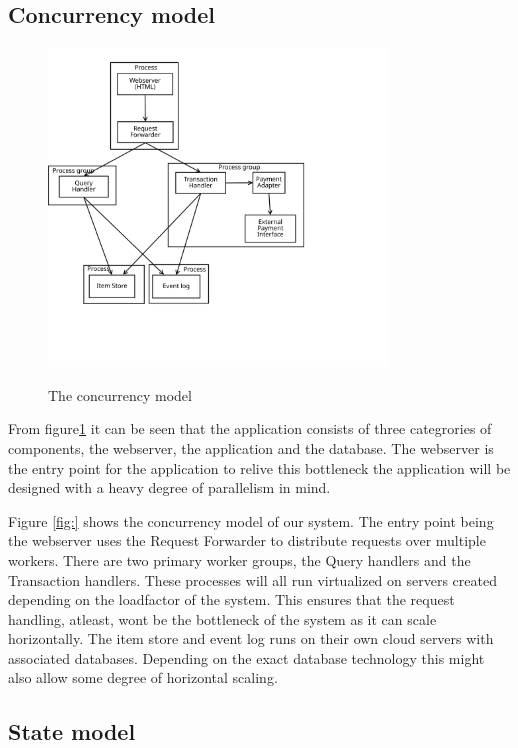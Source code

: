 \subsection{Concurrency model}
\label{sec:concurrency-model}

\begin{figure}[h!]
    \centering
    \caption{The concurrency model}
    \includegraphics[width=0.8\textwidth]{figures/concurrency-model}
    \label{fig:concurrency-model}
\end{figure}

From figure\ref{fig:concurrency-model} it can be seen that the application consists of
three categrories of components, the webserver, the application and the database.
The webserver is the entry point for the application to relive this bottleneck
the application will be designed with a heavy degree of parallelism in mind.


Figure \ref{fig:} shows the concurrency model of our system.
The entry point being the webserver uses the Request Forwarder to distribute
requests over multiple workers. There are two primary worker groups, the Query
handlers and the Transaction handlers. These processes will all run virtualized on servers
created depending on the loadfactor of the system. This ensures that the request
handling, atleast, wont be the bottleneck of the system as it can scale
horizontally. The item store and event log runs on their own cloud servers with
associated databases. Depending on the exact database technology this might also
allow some degree of horizontal scaling.


\subsection{State model}
\label{sec:state-model}

